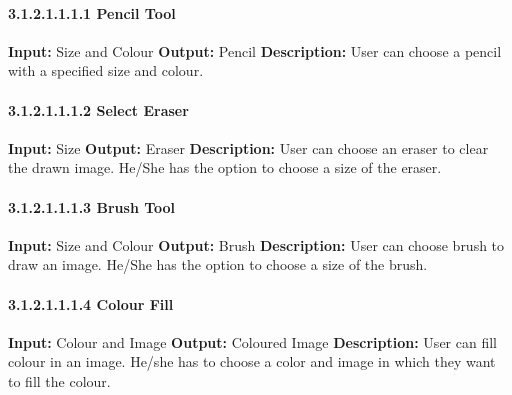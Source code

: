 \documentclass{scrreprt}
\begin{document}
\paragraph{3.1.2.1.1.1.1 Pencil Tool}
\hfill \vspace{2.5mm} \break 
\textbf{Input:} Size and Colour \newline
\textbf{Output:} Pencil
\vspace{1mm}\newline
\textbf{Description:} \newline 
User can choose a pencil with a specified size and colour.

\paragraph{3.1.2.1.1.1.2 Select Eraser}
\hfill \vspace{2.5mm} \break 
\textbf{Input:} Size \newline
\textbf{Output:} Eraser
\vspace{1mm}\newline
\textbf{Description:} \newline 
User can choose an eraser to 
clear the drawn image. He/She has the 
option to choose a size of the eraser.


\paragraph{3.1.2.1.1.1.3 Brush Tool}
\hfill \vspace{2.5mm} \break 
\textbf{Input:} Size and Colour \newline
\textbf{Output:} Brush
\vspace{1mm}\newline
\textbf{Description:} \newline 
User can choose brush to draw an image. He/She has the option to choose a size of the brush.

\paragraph{3.1.2.1.1.1.4 Colour Fill}
\hfill \vspace{2.5mm} \break 
\textbf{Input:} Colour and Image \newline
\textbf{Output:} Coloured Image
\vspace{1mm}\newline
\textbf{Description:} \newline 
User can fill colour in an image. He/she has to choose a color and image in which they want to fill the colour.
\end{document}
